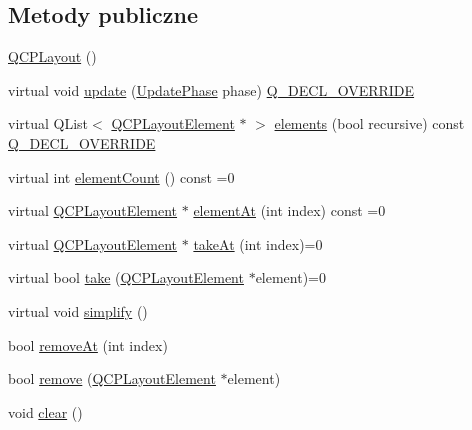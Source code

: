 \subsection*{Metody publiczne}
\begin{DoxyCompactItemize}
\item 
\hyperlink{class_q_c_p_layout_a04222e6e1361fd802d48f1a25b7020d4}{Q\+C\+P\+Layout} ()
\item 
virtual void \hyperlink{class_q_c_p_layout_a48ecc9c98ea90b547c3e27a931a8f7bd}{update} (\hyperlink{class_q_c_p_layout_element_a0d83360e05735735aaf6d7983c56374d}{Update\+Phase} phase) \hyperlink{qcustomplot_8hh_a42cc5eaeb25b85f8b52d2a4b94c56f55}{Q\+\_\+\+D\+E\+C\+L\+\_\+\+O\+V\+E\+R\+R\+I\+DE}
\item 
virtual Q\+List$<$ \hyperlink{class_q_c_p_layout_element}{Q\+C\+P\+Layout\+Element} $\ast$ $>$ \hyperlink{class_q_c_p_layout_aca129722c019f91d3367046f80abfa77}{elements} (bool recursive) const \hyperlink{qcustomplot_8hh_a42cc5eaeb25b85f8b52d2a4b94c56f55}{Q\+\_\+\+D\+E\+C\+L\+\_\+\+O\+V\+E\+R\+R\+I\+DE}
\item 
virtual int \hyperlink{class_q_c_p_layout_a39d3e9ef5d9b82ab1885ba1cb9597e56}{element\+Count} () const =0
\item 
virtual \hyperlink{class_q_c_p_layout_element}{Q\+C\+P\+Layout\+Element} $\ast$ \hyperlink{class_q_c_p_layout_afa73ca7d859f8a3ee5c73c9b353d2a56}{element\+At} (int index) const =0
\item 
virtual \hyperlink{class_q_c_p_layout_element}{Q\+C\+P\+Layout\+Element} $\ast$ \hyperlink{class_q_c_p_layout_a5a79621fa0a6eabb8b520cfc04fb601a}{take\+At} (int index)=0
\item 
virtual bool \hyperlink{class_q_c_p_layout_ada26cd17e56472b0b4d7fbbc96873e4c}{take} (\hyperlink{class_q_c_p_layout_element}{Q\+C\+P\+Layout\+Element} $\ast$element)=0
\item 
virtual void \hyperlink{class_q_c_p_layout_a41e6ac049143866e8f8b4964efab01b2}{simplify} ()
\item 
bool \hyperlink{class_q_c_p_layout_a2403f684fee3ce47132faaeed00bb066}{remove\+At} (int index)
\item 
bool \hyperlink{class_q_c_p_layout_a6c58f537d8086f352576ab7c5b15d0bc}{remove} (\hyperlink{class_q_c_p_layout_element}{Q\+C\+P\+Layout\+Element} $\ast$element)
\item 
void \hyperlink{class_q_c_p_layout_a02883bdf2769b5b227f0232dba1ac4ee}{clear} ()
\end{DoxyCompactItemize}
